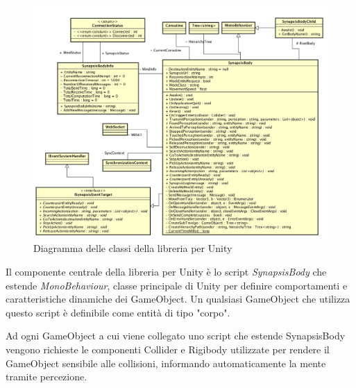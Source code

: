 \begin{figure}[H]
\centering
\includegraphics[width=\textwidth]{figures/diagramma_classi_script.png}
\caption{Diagramma delle classi della libreria per Unity}
\label{classi_libreria_unity}
\end{figure}

Il componente centrale della libreria per Unity è lo script \textit{SynapsisBody} che estende \textit{MonoBehaviour}, classe principale di Unity per definire comportamenti e caratteristiche dinamiche dei GameObject. Un qualsiasi GameObject che utilizza questo script è definibile come entità di tipo "corpo".

\medskip

Ad ogni GameObject a cui viene collegato uno script che estende SynapsisBody vengono richieste le componenti Collider \cite{unity_collision} e Rigibody \cite{unity_rigidbody} utilizzate per rendere il GameObject sensibile alle collisioni, informando automaticamente la mente tramite percezione.

